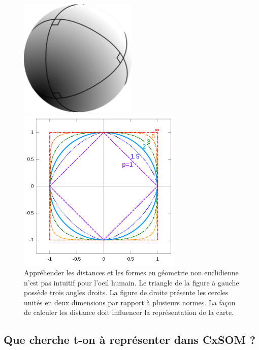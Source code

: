 \begin{figure}
\begin{minipage}{0.5\textwidth}
\centering\includegraphics[width=0.5\textwidth]{sphere.png}
\end{minipage}
\begin{minipage}{0.5\textwidth}
\centering\includegraphics[width=0.7\textwidth]{norm.png}
\end{minipage}
\label{fig:non_eucl}
\caption{Appréhender les distances et les formes en géometrie non euclidienne n'est pas intuitif pour l'oeil humain. Le triangle de la figure à gauche possède trois angles droits. La figure de droite présente les cercles unités en deux dimensions par rapport à plusieurs normes. La façon de calculer les distance doit influencer la représentation de la carte.}
\end{figure}


\subsection{Que cherche t-on à représenter dans CxSOM ?}

